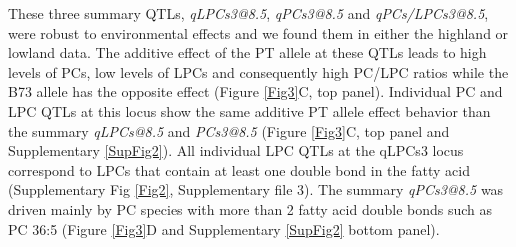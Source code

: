 \documentclass[9pt,twocolumn,twoside,lineno]{BioRxiv}
\begin{document}
These three summary QTLs, \textit{qLPCs3@8.5}, \textit{qPCs3@8.5} and \textit{qPCs/LPCs3@8.5}, were robust to environmental effects and we found them in either the highland or lowland data.
The additive effect of the PT allele at these QTLs leads to high levels of PCs, low levels of LPCs and consequently high PC/LPC ratios while the B73 allele has the opposite effect (Figure \ref{Fig3}C, top panel).
Individual PC and LPC QTLs at this locus show the same additive PT allele effect behavior than the summary \textit{qLPCs@8.5} and \textit{PCs3@8.5} (Figure \ref{Fig3}C, top panel and Supplementary \ref{SupFig2}).
All individual LPC QTLs at the qLPCs3 locus correspond to LPCs that contain at least one double bond in the fatty acid (Supplementary Fig \ref{Fig2}, Supplementary file 3).
The summary \textit{qPCs3@8.5} was driven mainly by PC species with more than 2 fatty acid double bonds such as PC 36:5 (Figure \ref{Fig3}D and Supplementary \ref{SupFig2} bottom panel).
\end{document}
